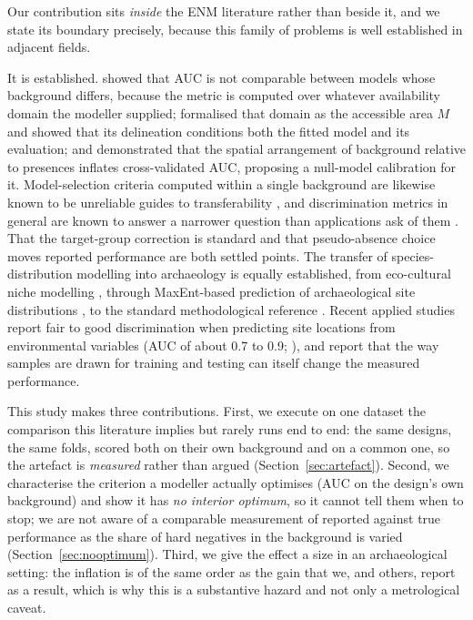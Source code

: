\documentclass[12pt]{article}
\begin{document}
Our contribution sits \emph{inside} the ENM literature rather than beside it, and we state its boundary precisely, because this family of problems is well established in adjacent fields.

It is established. \citet{lobo2008} showed that AUC is not comparable between models whose background differs, because the metric is computed over whatever availability domain the modeller supplied; \citet{barve2011} formalised that domain as the accessible area $M$ and showed that its delineation conditions both the fitted model and its evaluation; and \citet{hijmans2012} demonstrated that the spatial arrangement of background relative to presences inflates cross-validated AUC, proposing a null-model calibration for it.
Model-selection criteria computed within a single background are likewise known to be unreliable guides to transferability \citep{warren2011, radosavljevic2014}, and discrimination metrics in general are known to answer a narrower question than applications ask of them \citep{guillera2015, lobo2010}.
That the target-group correction is standard \citep{phillips2009} and that pseudo-absence choice moves reported performance \citep{barbet2012, senay2013} are both settled points.
The transfer of species-distribution modelling into archaeology is equally established, from eco-cultural niche modelling \citep{banks2006}, through MaxEnt-based prediction of archaeological site distributions \citep{yaworsky2020, howey2016, noviello2018}, to the standard methodological reference \citep{franklin2009}.
Recent applied studies report fair to good discrimination when predicting site locations from environmental variables (AUC of about 0.7 to 0.9; \citealp{castiello2021, wang2023}), and \citet{comer2023} report that the way samples are drawn for training and testing can itself change the measured performance.

This study makes three contributions.
First, we execute on one dataset the comparison this literature implies but rarely runs end to end: the same designs, the same folds, scored both on their own background and on a common one, so the artefact is \emph{measured} rather than argued (Section~\ref{sec:artefact}).
Second, we characterise the criterion a modeller actually optimises (AUC on the design's own background) and show it has \emph{no interior optimum}, so it cannot tell them when to stop; we are not aware of a comparable measurement of reported against true performance as the share of hard negatives in the background is varied (Section~\ref{sec:nooptimum}).
Third, we give the effect a size in an archaeological setting: the inflation is of the same order as the gain that we, and others, report as a result, which is why this is a substantive hazard and not only a metrological caveat.
\end{document}
